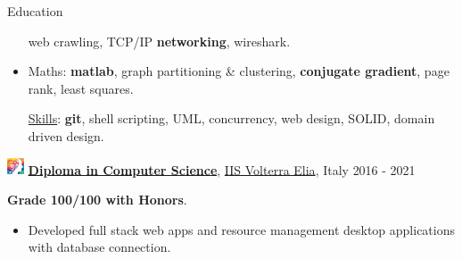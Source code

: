 \documentclass{cv} %
\def\intraexpvspace{0.15cm}
\def\titlelistvspace{-0.15cm}
\begin{document}
\begin{rSection}{Education}
\begin{itemize}
              web crawling,
              TCP/IP \textbf{networking},
              wireshark.
        \item Maths:
              \textbf{matlab},
              graph partitioning \& clustering,
              \textbf{conjugate gradient},
              page rank,
              least squares.

              \vspace*{-0.1cm}\hspace*{-0.4cm}\underline{Skills}:
              \textbf{git},
              shell scripting,
              UML,
              concurrency,
              web design,
              SOLID,
              domain driven design.
    \end{itemize}
    \vspace{\intraexpvspace}
    \includegraphics[width=0.5cm, trim={0cm 1cm 0cm 0cm}]{iisve-icon.png}
    {\bf \underline{Diploma in Computer Science}},
    \href{https://www.istitutovolterraelia.it/}{IIS Volterra Elia},
    Italy
    \hfill{2016 - 2021}

    \textbf{Grade 100/100 with Honors}.

    \vspace{\titlelistvspace}\begin{itemize}
        \itemsep -3pt {}
        \item Developed full stack web apps and resource management desktop applications with database connection.
    \end{itemize}


\end{rSection}
\end{document}
